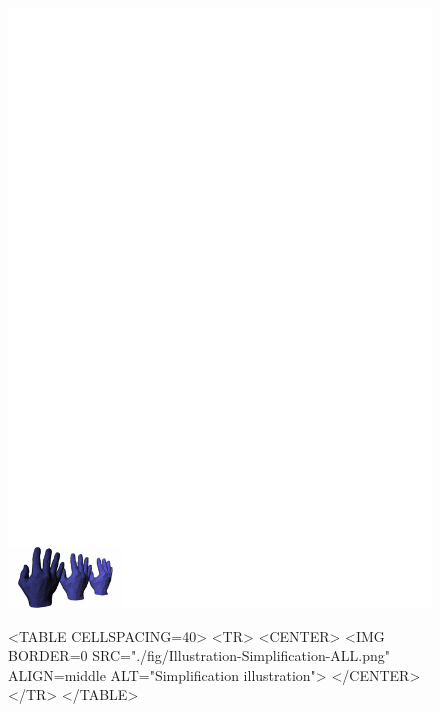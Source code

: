 
\begin{figure}[htbp]
\begin{ccTexOnly}
\begin{center}
\includegraphics[width=17cm]{Surface_mesh_simplification/fig/Illustration-Simplification-ALL} %
\end{center}
\end{ccTexOnly}
\begin{ccHtmlOnly}
<TABLE CELLSPACING=40>
<TR>
<CENTER>
<IMG BORDER=0 SRC="./fig/Illustration-Simplification-ALL.png" ALIGN=middle ALT="Simplification illustration">
</CENTER>
</TR>
</TABLE>
\end{ccHtmlOnly}
\end{figure}

